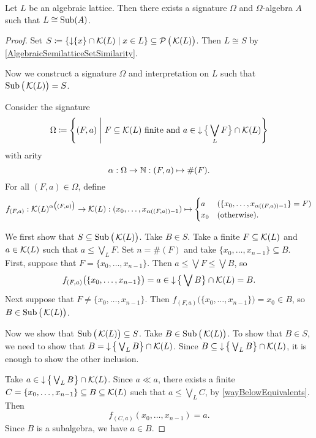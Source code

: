 \begin{theorem}
Let $L$ be an algebraic lattice. Then there exists a signature $\Omega$ and $\Omega$-algebra $A$ such that $L\cong \operatorname{Sub}(A)$.
\end{theorem}
\begin{proof}
Set $S \defeq \setbuilder{\downset\{x\}\cap \compacts(L)}{x\in L}\subseteq \powerset\big(\compacts(L)\big)$. Then $L\cong S$ by \ref{AlgebraicSemilatticeSetSimilarity}.

Now we construct a signature $\Omega$ and interpretation on $L$ such that $\operatorname{Sub}\big(\operatorname{\mathcal{K}}(L)\big) = S$.

Consider the signature
\[ \Omega \defeq \setbuilder{(F,a)}{\text{$F\subseteq \compacts(L)$ finite and $a\in \downset\big\{\bigvee_L F\big\} \cap \compacts(L)$}} \]
with arity
\[ \alpha: \Omega\to \mathbb{N}: (F,a) \mapsto \#(F). \]
For all $(F,a)\in \Omega$, define
\[ f_{(F,a)}: \operatorname{\mathcal{K}}(L)^{\alpha\big((F,a)\big)} \to \operatorname{\mathcal{K}}(L): (x_0, \ldots, x_{\alpha((F,a))-1}) \mapsto \begin{cases}
a & (\{x_0, \ldots, x_{\alpha((F,a))-1}\} = F) \\
x_0 & (\text{otherwise}).
\end{cases} \]

We first show that $S\subseteq \operatorname{Sub}\big(\operatorname{\mathcal{K}}(L)\big)$. Take $B\in S$. Take a finite $F\subseteq \operatorname{\mathcal{K}}(L)$ and $a\in \operatorname{\mathcal{K}}(L)$ such that $a\leq \bigvee_L F$. Set $n = \#(F)$ and take $\{x_0, \ldots, x_{n-1}\}\subseteq B$. First, suppose that $F = \{x_0, \ldots, x_{n-1}\}$. Then $a\leq \bigvee F \leq \bigvee B$, so
\[ f_{(F,a)}\big(\{x_0, \ldots, x_{n-1}\}\big) = a\in \operatorname{\downarrow} \big\{\bigvee B\big\}\cap \operatorname{\mathcal{K}}(L) = B. \]
Next suppose that $F \neq \{x_0, \ldots, x_{n-1}\}$. Then $f_{(F,a)}\big(\{x_0, \ldots, x_{n-1}\}\big) = x_0 \in B$, so $B\in \operatorname{Sub}\big(\operatorname{\mathcal{K}}(L)\big)$.

Now we show that $\operatorname{Sub}\big(\operatorname{\mathcal{K}}(L)\big) \subseteq S$. Take $B\in \operatorname{Sub}\big(\operatorname{\mathcal{K}}(L)\big)$. To show that $B\in S$, we need to show that $B = \operatorname{\downarrow} \big\{\bigvee_L B\big\} \cap \operatorname{\mathcal{K}}(L)$. Since $B\subseteq \operatorname{\downarrow} \big\{\bigvee_L B\big\} \cap \operatorname{\mathcal{K}}(L)$, it is enough to show the other inclusion.

Take $a\in \operatorname{\downarrow} \big\{\bigvee_L B\big\} \cap \operatorname{\mathcal{K}}(L)$. Since $a\ll a$, there exists a finite $C = \{x_0, \ldots, x_{n-1}\}\subseteq B\subseteq \operatorname{\mathcal{K}}(L)$ such that $a\leq \bigvee_L C$, by \ref{wayBelowEquivalents}.
Then
\[ f_{(C,a)}(x_0, \ldots, x_{n-1}) = a. \]
Since $B$ is a subalgebra, we have $a\in B$.
\end{proof}

